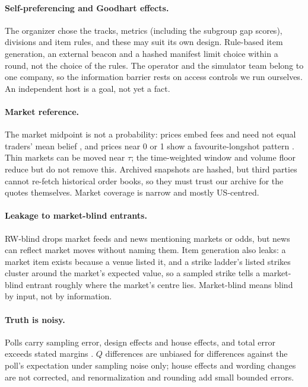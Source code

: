 \documentclass[11pt]{article}
\begin{document}
\paragraph{Self-preferencing and Goodhart effects.} The organizer chose the tracks, metrics (including the subgroup gap scores), divisions and item rules, and these may suit its own design. Rule-based item generation, an external beacon and a hashed manifest limit choice within a round, not the choice of the rules. The operator and the simulator team belong to one company, so the information barrier rests on access controls we run ourselves. An independent host is a goal, not yet a fact.

\paragraph{Market reference.} The market midpoint is not a probability: prices embed fees and need not equal traders' mean belief \citep{manski2006interpreting}, and prices near 0 or 1 show a favourite-longshot pattern \citep{snowberg2010,page2013calibrated}. Thin markets can be moved near $\tau$; the time-weighted window and volume floor reduce but do not remove this. Archived snapshots are hashed, but third parties cannot re-fetch historical order books, so they must trust our archive for the quotes themselves. Market coverage is narrow and mostly US-centred.

\paragraph{Leakage to market-blind entrants.} RW-blind drops market feeds and news mentioning markets or odds, but news can reflect market moves without naming them. Item generation also leaks: a market item exists because a venue listed it, and a strike ladder's listed strikes cluster around the market's expected value, so a sampled strike tells a market-blind entrant roughly where the market's centre lies. Market-blind means blind by input, not by information.

\paragraph{Truth is noisy.} Polls carry sampling error, design effects and house effects, and total error exceeds stated margins \citep{shiranimehr2018}. $Q$ differences are unbiased for differences against the poll's expectation under sampling noise only; house effects and wording changes are not corrected, and renormalization and rounding add small bounded errors.
\end{document}

